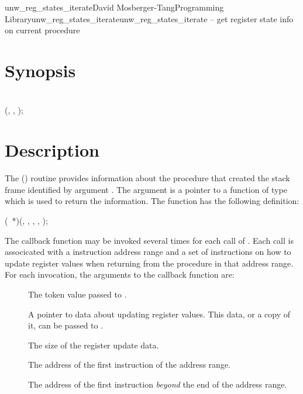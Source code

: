 \documentclass{article}
\begin{document}
\begin{Name}{3}{unw\_reg\_states\_iterate}{David Mosberger-Tang}{Programming Library}{unw\_reg\_states\_iterate}unw\_reg\_states\_iterate -- get register state info on current procedure
\end{Name}

\section{Synopsis}

\\

 (, , );\\

\section{Description}

The () routine provides
information about the procedure that created the stack frame
identified by argument .  The  argument is a pointer
to a function of type  which is used to
return the information.  The function  has the
following definition:

 (~*)(,
			,
			 ,
			 ,  );

The callback function may be invoked several times for each call of . Each call is associcated with a instruction address range and a set of instructions on how to update register values when returning from the procedure in that address range.  For each invocation, the arguments to the callback function are:
\begin{description}
\item[ ] The token value passed to . \\
\item[ ] A pointer to data about
  updating register values. This data, or a copy of it, can be passed
  to .\\
\item[ ] The size of the register update data. \\
\item[ ] The address of the first
  instruction of the address range.  \\
\item[ ] The address of the first
  instruction \emph{beyond} the end of the address range.  \\
\end{description}
\end{document}
